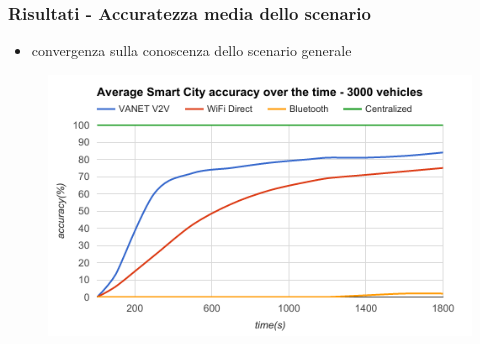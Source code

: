 \documentclass{beamer}
\begin{document}
\begin{frame}
  \frametitle{Risultati - Accuratezza media dello scenario}
  \begin{itemize}
    \item convergenza sulla conoscenza dello scenario generale
  \end{itemize}
  \begin{figure}
    \includegraphics[scale=0.45]{img/graphics/global_accuracy.png}
  \end{figure}
\end{frame}
\end{document}
